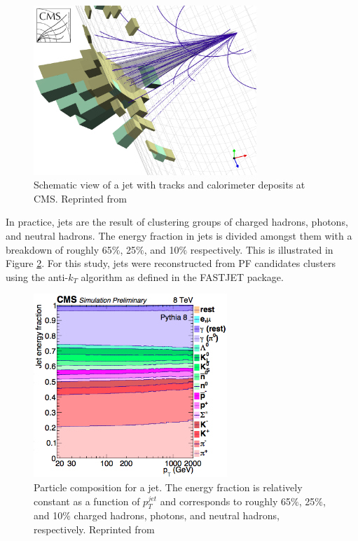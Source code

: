 \begin{figure}[h]
  	\label{fig:jets2}
 	\centering
 	\includegraphics[width=0.75\textwidth]{figures/cmsjet.png}
 	\singlespace
 	\caption{Schematic view of a jet with tracks and calorimeter deposits at CMS. Reprinted from \cite{jetCMS}}
 \end{figure}

In practice, jets are the result of clustering groups of charged hadrons, photons, and neutral hadrons. The energy fraction in jets is divided amongst them with a breakdown of roughly 65$\%$, 25$\%$, and 10$\%$ respectively. This is illustrated in Figure \ref{fig:jme}. For this study, jets were reconstructed from PF candidates clusters using the anti-$k_{T}$ algorithm\cite{Cacciari:2008gp} as defined in the FASTJET package\cite{Cacciari:2011ma}.

\begin{figure}[h]
  	\label{fig:jme}
 	\centering
 	\includegraphics[width=0.65\textwidth]{figures/jme.png}
 	\singlespace
 	\caption{Particle composition for a jet. The energy fraction is relatively constant as a function of $p_{T}^{jet}$ and corresponds to roughly 65$\%$, 25$\%$, and 10$\%$ charged hadrons, photons, and neutral hadrons, respectively. Reprinted from \cite{Cacciari:2008gp}}
 \end{figure}

